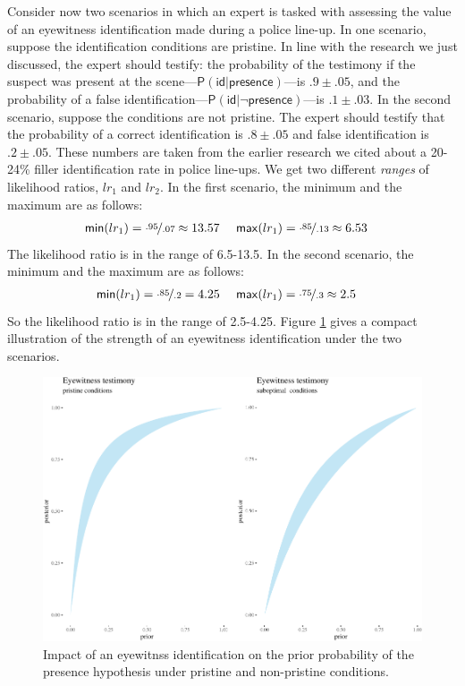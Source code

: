 \documentclass[
  10pt,
  dvipsnames,enabledeprecatedfontcommands]{scrartcl}
\newcommand{\pr}[1]{\mathsf{P}(#1)}
\begin{document}
Consider now two scenarios in which an expert is tasked with assessing
the value of an eyewitness identification made during a police line-up.
In one scenario, suppose the identification conditions are pristine. In
line with the research we just discussed, the expert should testify: the
probability of the testimony if the suspect was present at the
scene---\(\pr{\textsf{id} \vert \textsf{presence}}\)---is
\(.9 \pm .05\), and the probability of a false
identification---\(\pr{\textsf{id} \vert \neg \textsf{presence}}\)---is
\(.1\pm .03\). In the second scenario, suppose the conditions are not
pristine. The expert should testify that the probability of a correct
identification is \(.8 \pm .05\) and false identification is
\(.2 \pm .05\). These numbers are taken from the earlier research we
cited about a 20-24\% filler identification rate in police line-ups. We
get two different \emph{ranges} of likelihood ratios, \(lr_1\) and
\(lr_2\). In the first scenario, the minimum and the maximum are as
follows: \begin{align*}
\mathsf{min}(lr_1) = \nicefrac{.95}{.07} \approx 13.57  & \,\,\,\,\,\,\,\,  \mathsf{max}(lr_1) = \nicefrac{.85}{.13} \approx 6.53  
\end{align*} \noindent The likelihood ratio is in the range of 6.5-13.5.
In the second scenario, the minimum and the maximum are as follows:
\begin{align*}
\mathsf{min}(lr_1) = \nicefrac{.85}{.2} =  4.25 &  \,\,\,\,\,\,\,\,   \mathsf{max}(lr_1) = \nicefrac{.75}{.3} \approx 2.5  
\end{align*} \noindent So the likelihood ratio is in the range of
2.5-4.25. Figure \ref{fig:eyewitness3b} gives a compact illustration of
the strength of an eyewitness identification under the two scenarios.

\begin{figure}[h]

\begin{center}\includegraphics[width=1\linewidth]{lr-chapter6_files/figure-latex/eyewitness2b-1} \end{center}
\caption{Impact of an eyewitnss identification on the prior probability of the presence hypothesis under pristine and non-pristine conditions.}
\label{fig:eyewitness3b}
\end{figure}
\end{document}

